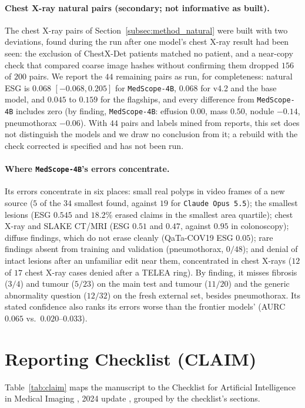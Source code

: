 \documentclass[5p,times,twocolumn,authoryear]{elsarticle}
\begin{document}
\paragraph{Chest X-ray natural pairs (secondary; not informative as built).} The chest X-ray pairs of Section~\ref{subsec:method_natural} were built with two deviations, found during the run after one model's chest X-ray result had been seen: the exclusion of ChestX-Det patients matched no patient, and a near-copy check that compared coarse image hashes without confirming them dropped $156$ of $200$ pairs. We report the $44$ remaining pairs as run, for completeness: natural ESG is $0.068$ $[-0.068, 0.205]$ for \texttt{MedScope-4B}, $0.068$ for v4.2 and the base model, and $0.045$ to $0.159$ for the flagships, and every difference from \texttt{MedScope-4B} includes zero (by finding, \texttt{MedScope-4B}: effusion $0.00$, mass $0.50$, nodule $-0.14$, pneumothorax $-0.06$). With $44$ pairs and labels mined from reports, this set does not distinguish the models and we draw no conclusion from it; a rebuild with the check corrected is specified and has not been run.

\paragraph{Where \texttt{MedScope-4B}'s errors concentrate.} Its errors concentrate in six places: small real polyps in video frames of a new source ($5$ of the $34$ smallest found, against $19$ for \texttt{Claude Opus 5.5}); the smallest lesions (ESG $0.545$ and $18.2\%$ erased claims in the smallest area quartile); chest X-ray and SLAKE CT/MRI (ESG $0.51$ and $0.47$, against $0.95$ in colonoscopy); diffuse findings, which do not erase cleanly (QaTa-COV19 ESG $0.05$); rare findings absent from training and validation (pneumothorax, $0/48$); and denial of intact lesions after an unfamiliar edit near them, concentrated in chest X-rays ($12$ of $17$ chest X-ray cases denied after a TELEA ring). By finding, it misses fibrosis ($3/4$) and tumour ($5/23$) on the main test and tumour ($11/20$) and the generic abnormality question ($12/32$) on the fresh external set, besides pneumothorax. Its stated confidence also ranks its errors worse than the frontier models' (AURC $0.065$ vs.\ $0.020$--$0.033$).

\section{Reporting Checklist (CLAIM)}
\label{app:claim}
Table~\ref{tab:claim} maps the manuscript to the Checklist for Artificial Intelligence in Medical Imaging \citep{mongan2020claim}, 2024 update \citep{tejani2024claim}, grouped by the checklist's sections.
\end{document}
